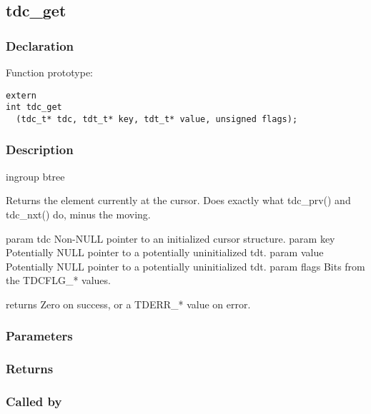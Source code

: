 
\newpage
\subsection{tdc\_get}
\subsubsection{Declaration} Function prototype:

\begin{verbatim}
extern
int tdc_get
  (tdc_t* tdc, tdt_t* key, tdt_t* value, unsigned flags);
\end{verbatim}

\subsubsection{Description}


 ingroup btree

 Returns the element currently at the cursor.
 Does exactly what tdc\_prv() and tdc\_nxt() do, minus the moving.

 param tdc Non-NULL pointer to an initialized cursor structure.
 param key Potentially NULL pointer to a potentially uninitialized tdt.
 param value Potentially NULL pointer to a potentially uninitialized tdt.
 param flags Bits from the TDCFLG\_* values.

 returns Zero on success, or a TDERR\_* value on error.
 

\subsubsection{Parameters}
\subsubsection{Returns}
\subsubsection{Called by}

